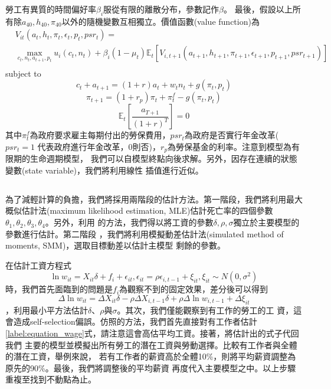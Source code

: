 \documentclass[12pt]{article}
\begin{document}
\begin{CJK*}{UTF8}{bkai}
勞工有異質的時間偏好率$\beta_i$服從有限的離散分布，參數記作$\beta$。
最後，假設以上所有除$a_{40}, h_{40}, \pi_{40}$以外的隨機變數互相獨立。價值函數(value function)為
\begin{equation}
    \begin{split}
        &V_{it}(a_t,h_t,\pi_t,\epsilon_t,p_t,psr_t) = \\
        &\max_{c_t,n_t,a_{t+1},p_t} u_i(c_t,n_t) 
        + \beta_i (1-\mu_t) \mathbb{E}_t[V_{i,t+1}(a_{t+1},h_{t+1},\pi_{t+1},\epsilon_{t+1},p_{t+1},psr_{t+1})] \\
    \end{split}
\end{equation}
subject to
\begin{equation}
    c_t + a_{t+1} = (1+r)a_t + w_t n_t + g(\pi_t,p_t)
\end{equation}
\begin{equation}
    \pi_{t+1} = (1+r_p) \pi_t + \pi^f_t - g(\pi_t,p_t)
\end{equation}
\begin{equation}
    \mathbb{E}_t[\frac{a_{T+1}}{(1+r)^T}] = 0
\end{equation}
其中$\pi^f_t$為政府要求雇主每期付出的勞保費用，$psr_t$為政府是否實行年金改革($psr_t=1$
代表政府進行年金改革，0則否)，$r_p$為勞保基金的利率。注意到模型為有限期的生命週期模型，
我們可以自模型終點向後求解。另外，因存在連續的狀態變數(state variable)，我們將利用線性
插值進行近似。

\subsection*{}
為了減輕計算的負擔，我們將採用兩階段的估計方法。第一階段，我們將利用最大
概似估計法(maximum likelihood estimation, MLE)估計死亡率的四個參數
$\theta_1,\theta_2,\theta_3,\theta_4$。另外，利用\cite{pistaferri2015}
的方法，我們得以將工資的參數$\delta,\rho,\sigma$獨立於主要模型的參數進行估計。第二階段
，我們將利用模擬動差估計法(simulated method of moments, SMM)，選取目標動差以估計主模型
剩餘的參數。

在估計工資方程式
\begin{equation}
    \ln w_{it} = X_{it}\delta + f_i + \epsilon_{it}, \epsilon_{it} = \rho \epsilon_{i,t-1} + \xi_{it}, \xi_{it} \sim N(0,\sigma^2)
\end{equation}
時，我們首先面臨到的問題是$f_i$為觀察不到的固定效果，差分後可以得到
\begin{equation}\label{label:equation_wage}
    \Delta \ln w_{it} = \Delta X_{it}\delta - \rho \Delta X_{i,t-1} \delta + \rho \Delta \ln w_{i,t-1} + \Delta \xi_{it}
\end{equation}
，利用最小平方法估計$\delta$、$\rho$與$\sigma$。其次，我們僅能觀察到有工作的勞工的工
資，這會造成self-selection偏誤。仿照\cite{french2005}的方法，我們首先直接對有工作者估計
\ref{label:equation_wage}式，請注意這會高估平均工資。接著，將估計出的式子代回我們
主要的模型並模擬出所有勞工的潛在工資與勞動選擇。比較有工作者與全體的潛在工資，舉例來說，
若有工作者的薪資高於全體10\%，則將平均薪資調整為原先的90\%。最後，我們將調整後的平均薪資
再度代入主要模型之中。以上步驟重複至找到不動點為止。


\end{CJK*}
\end{document}
